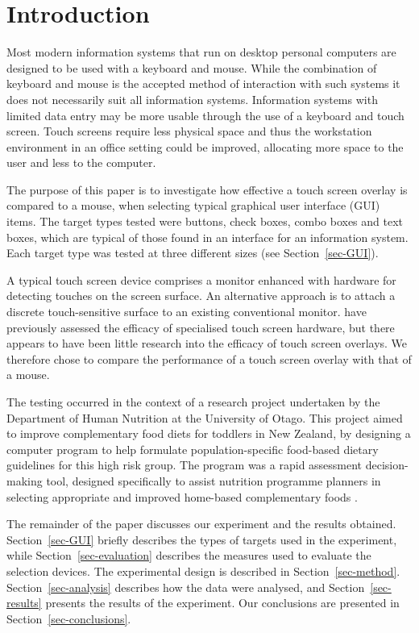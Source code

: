 \documentclass{elsart}
\begin{document}
\newcommand{\ISOnine}{ISO 9241-9}


\section{Introduction}
\label{sec-introduction}

Most modern information systems that run on desktop personal computers
are designed to be used with a keyboard and mouse. While the combination
of keyboard and mouse is the accepted method of interaction with such
systems it does not necessarily suit all information systems.
Information systems with limited data entry may be more usable through
the use of a keyboard and touch screen. Touch screens require less
physical space and thus the workstation environment in an office setting
could be improved, allocating more space to the user and less to the
computer.

The purpose of this paper is to investigate how effective a touch screen
overlay is compared to a mouse, when selecting typical graphical user
interface (GUI) items. The target types tested were buttons, check
boxes, combo boxes and text boxes, which are typical of those found in
an interface for an information system. Each target type was tested at
three different sizes (see Section~\ref{sec-GUI}).

A typical touch screen device comprises a monitor enhanced with hardware
for detecting touches on the screen surface. An alternative approach is
to attach a discrete touch-sensitive surface to an existing conventional
monitor. \citet{Sear-A-1991-IJMMS} have previously assessed the efficacy
of specialised touch screen hardware, but there appears to have been
little research into the efficacy of touch screen overlays. We therefore
chose to compare the performance of a touch screen overlay with that of
a mouse.

The testing occurred in the context of a research project undertaken by
the Department of Human Nutrition at the University of Otago. This
project aimed to improve complementary food diets for toddlers in New
Zealand, by designing a computer program to help formulate
population-specific food-based dietary guidelines for this high risk
group. The program was a rapid assessment decision-making tool, designed
specifically to assist nutrition programme planners in selecting
appropriate and improved home-based complementary foods
\citep{Ferg-E-2004}.

The remainder of the paper discusses our experiment and the results
obtained. Section~\ref{sec-GUI} briefly describes the types of targets
used in the experiment, while Section~\ref{sec-evaluation} describes the
measures used to evaluate the selection devices. The experimental design
is described in Section~\ref{sec-method}. Section~\ref{sec-analysis}
describes how the data were analysed, and Section~\ref{sec-results}
presents the results of the experiment. Our conclusions are presented in
Section~\ref{sec-conclusions}.
\end{document}

